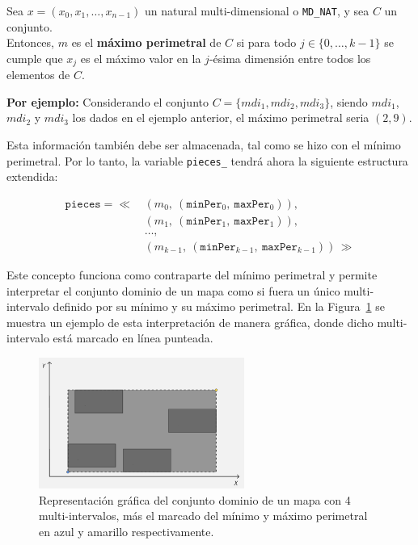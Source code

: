 \begin{center}
Sea $x = (x_0, x_1, \dots, x_{n-1})$ un natural multi-dimensional o \texttt{MD\_NAT}, y sea $C$ un conjunto. \\
Entonces, $m$ es el \textbf{máximo perimetral} de $C$ si para todo $j \in \{0, \dots, k-1\}$ se cumple que $x_j$ es el máximo valor en la $j$-ésima dimensión entre todos los elementos de $C$.

\textbf{Por ejemplo:} Considerando el conjunto $C = \{mdi_1,mdi_2,mdi_3\}$, siendo $mdi_1$, $mdi_2$ y $mdi_3$ los dados en el ejemplo anterior, el máximo perimetral seria $(2,9)$. 
\end{center}

Esta información también debe ser almacenada, tal como se hizo con el mínimo perimetral. Por lo tanto, la variable \texttt{pieces\_} tendrá ahora la siguiente estructura extendida:


\begin{align*}
\texttt{pieces} = \ll \, 
  & (m_0,\ (\texttt{minPer}_0,\ \texttt{maxPer}_0)), \\
  & (m_1,\ (\texttt{minPer}_1,\ \texttt{maxPer}_1)), \\
  & \dots, \\
  & (m_{k-1},\ (\texttt{minPer}_{k-1},\ \texttt{maxPer}_{k-1})) \,\gg
\end{align*}



Este concepto funciona como contraparte del mínimo perimetral y permite interpretar el conjunto dominio de un mapa como si fuera un único multi-intervalo definido por su mínimo y su máximo perimetral. En la Figura~\ref{fig:minmaxPer1} se muestra un ejemplo de esta interpretación de manera gráfica, donde dicho multi-intervalo está marcado en línea punteada.

\begin{figure}[ht]
  \centering
  \includegraphics[width=0.6\textwidth]{figures/Orden/image.png}
  \caption{Representación gráfica del conjunto dominio de un mapa con 4 multi-intervalos, más el marcado del mínimo y máximo perimetral en azul y amarillo respectivamente.}
  \label{fig:minmaxPer1}
\end{figure}


